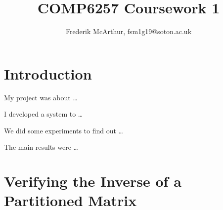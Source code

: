 \documentclass[a4paper, 11pt]{article}
\title{COMP6257 Coursework 1}
\author{Frederik McArthur, fsm1g19@soton.ac.uk}
\begin{document}
\maketitle
\tableofcontents

\section{Introduction}

My project was about \ldots

I developed a system to \ldots

We did some experiments to find out \ldots

The main results were \ldots

\pagebreak

\section{Verifying the Inverse of a Partitioned Matrix}
\end{document}
